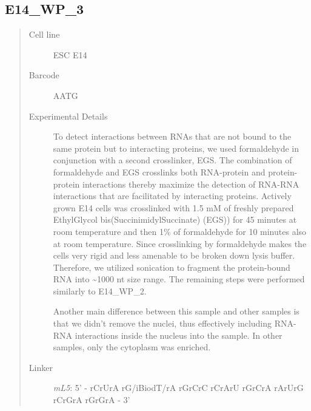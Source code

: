 \documentclass[letterpaper,10pt,english]{sphinxmanual}
\begin{document}
\subsection{E14\_WP\_3}
\label{Data_Resources:e14-wp-3}\begin{quote}\begin{description}
\item[{Cell line}] \leavevmode
ESC E14

\item[{Barcode}] \leavevmode
AATG

\item[{Experimental Details}] \leavevmode
To detect interactions between RNAs that are not bound to the same protein
but to interacting proteins, we used formaldehyde in conjunction with a second crosslinker, EGS.
The combination of formaldehyde and EGS crosslinks both RNA-protein and protein-protein
interactions thereby maximize the detection of RNA-RNA interactions that are facilitated by
interacting proteins. Actively grown E14 cells was crosslinked with 1.5 mM of freshly prepared
EthylGlycol bis(SuccinimidylSuccinate) (EGS)) for 45 minutes at room temperature and then 1\% of
formaldehyde for 10 minutes also at room temperature. Since crosslinking by formaldehyde makes
the cells very rigid and less amenable to be broken down lysis buffer. Therefore, we utilized
sonication to fragment the protein-bound RNA into \textasciitilde{}1000 nt size range. The remaining steps were
performed similarly to E14\_WP\_2.

Another main difference between this sample and other samples is that we didn't remove the nuclei,
thus effectively including RNA-RNA interactions inside the nucleus into the sample. In other
samples, only the cytoplasm was enriched.

\item[{Linker}] \leavevmode
\emph{mL5}: 5' - rCrUrA rG/iBiodT/rA rGrCrC rCrArU rGrCrA rArUrG rCrGrA rGrGrA - 3'

\end{description}\end{quote}
\end{document}
